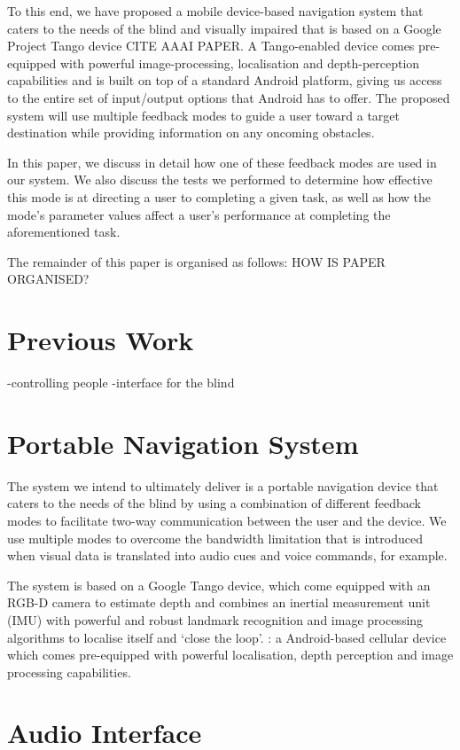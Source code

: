 \documentclass[format=sigconf, review=true, screen=true, anonymous=true]{acmart}
\begin{document}
To this end, we have proposed a mobile device-based navigation system that caters to the needs of the blind and visually impaired that is based on a Google Project Tango device {CITE AAAI PAPER}. A Tango-enabled device comes pre-equipped with powerful image-processing, localisation and depth-perception capabilities and is built on top of a standard Android platform, giving us access to the entire set of input/output options that Android has to offer. The proposed system will use multiple feedback modes to guide a user toward a target destination while providing information on any oncoming obstacles.

In this paper, we discuss in detail how one of these feedback modes are used in our system. We also discuss the tests we performed to determine how effective this mode is at directing a user to completing a given task, as well as how the mode's parameter values affect a user's performance at completing the aforementioned task. 

The remainder of this paper is organised as follows: HOW IS PAPER ORGANISED?

\section{Previous Work}

-controlling people
-interface for the blind

\section{Portable Navigation System}

The system we intend to ultimately deliver is a portable navigation device that caters to the needs of the blind by using a combination of different feedback modes to facilitate two-way communication between the user and the device. We use multiple modes to overcome the bandwidth limitation that is introduced when visual data is translated into audio cues and voice commands, for example. 

The system is based on a Google Tango device, which come equipped with an RGB-D camera to estimate depth and combines an inertial measurement unit (IMU) with powerful and robust landmark recognition and image processing algorithms to localise itself and `close the loop'. : a Android-based cellular device which comes pre-equipped with powerful localisation, depth perception and image processing capabilities. 

\section{Audio Interface}
\end{document}
